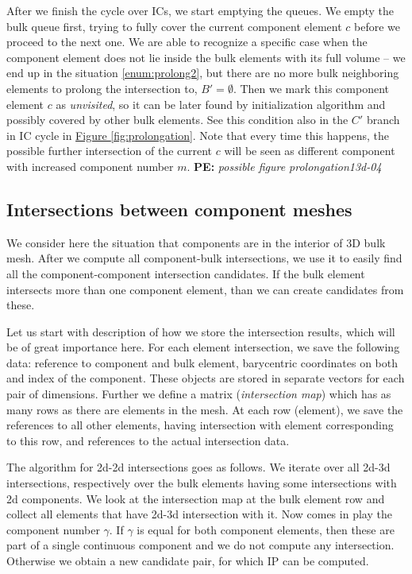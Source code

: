 \documentclass{elsarticle}
\newcommand{\fig}[1]{\hyperref[#1]{Figure \ref{#1}}}
\newcommand{\notePE}[1]{{\color{Orange} \textbf{PE: } \textit{#1}}}
\begin{document}
After we finish the cycle over ICs, we start emptying the queues. We empty the bulk queue first,
trying to fully cover the current component element $c$ before we proceed to the next one. 
We are able to recognize a specific case when the component element 
does not lie inside the bulk elements with its full volume -- we end up in the situation \ref{enum:prolong2},
but there are no more bulk neighboring elements to prolong the intersection to, $B'=\emptyset$.
Then we mark this component element $c$ as \emph{unvisited}, so it can be later found by initialization algorithm and possibly covered by other bulk elements. See this condition also in the $C'$ branch in IC cycle in \fig{fig:prolongation}. Note that every time this happens, the possible further intersection 
of the current $c$ will be seen as different component with increased component number $m$. \notePE{possible figure prolongation13d-04}



\subsection{Intersections between component meshes}
\label{sec:components}
We consider here the situation that components are in the interior of 3D bulk mesh. After we compute
all component-bulk intersections, we use it to easily find all the component-component intersection candidates.
If the bulk element intersects more than one component element, than we can create candidates from these.

Let us start with description of how we store the intersection results, which will be of great importance here.
For each element intersection, we save the following data: reference to component and bulk element, barycentric coordinates on both and index of the component. These objects are stored in separate vectors for each pair 
of dimensions. Further we define a matrix (\emph{intersection map}) which has as many rows as there are elements in the mesh.
At each row (element), we save the references to all other elements, having intersection with element corresponding to this row, and references to the actual intersection data.

The algorithm for 2d-2d intersections goes as follows. We iterate over all 2d-3d intersections, respectively over
the bulk elements having some intersections with 2d components. We look at the intersection map at the
bulk element row and collect all elements that have 2d-3d intersection with it.
Now comes in play the component number $\gamma$. If $\gamma$ is equal for both component elements, then 
these are part of a single continuous component and we do not compute any intersection.
Otherwise we obtain a new candidate pair, for which IP can be computed.
\end{document}

